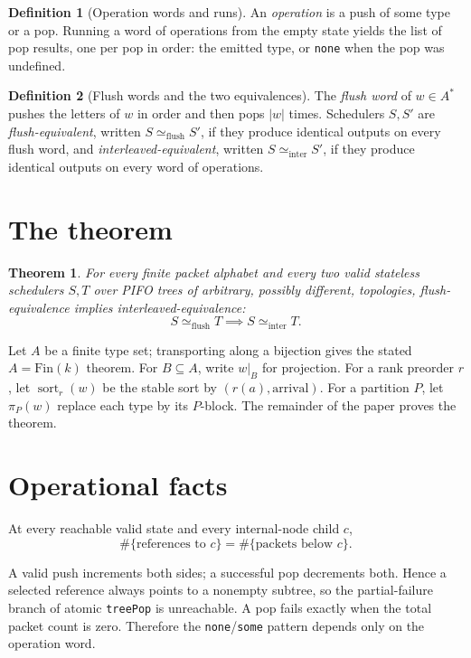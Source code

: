 \documentclass{amsart}
\theoremstyle{plain}
\newtheorem{theorem}{Theorem}
\theoremstyle{definition}
\newtheorem{definition}{Definition}
\begin{document}
\begin{definition}[Operation words and runs]
An \emph{operation} is a push of some type or a pop. Running a word of operations from the empty state
yields the list of pop results, one per pop in order: the emitted type, or \texttt{none} when the pop
was undefined.
\end{definition}

\begin{definition}[Flush words and the two equivalences]
The \emph{flush word} of $w\in A^{*}$ pushes the letters of $w$ in order and then pops $|w|$ times.
Schedulers $S,S'$ are \emph{flush-equivalent}, written $S\simeq_{\mathrm{flush}}S'$, if they produce
identical outputs on every flush word, and \emph{interleaved-equivalent}, written
$S\simeq_{\mathrm{inter}}S'$, if they produce identical outputs on every word of operations.
\end{definition}

\section{The theorem}

\begin{theorem}
For every finite packet alphabet and every two valid stateless schedulers $S,T$ over PIFO trees of
arbitrary, possibly different, topologies, flush-equivalence implies interleaved-equivalence:
\[
S\simeq_{\mathrm{flush}}T \implies S\simeq_{\mathrm{inter}}T.
\]
\end{theorem}

Let $A$ be a finite type set; transporting along a bijection gives the stated $A=\mathrm{Fin}(k)$
theorem. For $B\subseteq A$, write $w|_B$ for projection. For a rank preorder $r$, let
$\operatorname{sort}_r(w)$ be the stable sort by $(r(a),\text{arrival})$. For a partition $P$, let
$\pi_P(w)$ replace each type by its $P$-block. The remainder of the paper proves the theorem.

\section{Operational facts}

At every reachable valid state and every internal-node child $c$,
\begin{equation*}
\#\{\text{references to }c\}
=
\#\{\text{packets below }c\}. \tag{1}
\end{equation*}

A valid push increments both sides; a successful pop decrements both. Hence a selected reference always points to a nonempty subtree, so the partial-failure branch of atomic \texttt{treePop} is unreachable. A pop fails exactly when the total packet count is zero. Therefore the \texttt{none}/\texttt{some} pattern depends only on the operation word.
\end{document}

